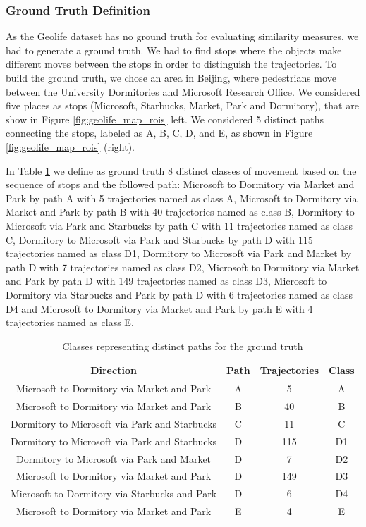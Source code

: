 \documentclass[12pt]{article}
\begin{document}
\subsubsection{Ground Truth Definition}
{As the Geolife dataset has no ground truth for evaluating similarity measures, we had to generate a ground truth. We had to find stops where the objects make different moves between the stops in order to distinguish the trajectories.}
To build the ground truth, we chose an area in Beijing, where pedestrians move between the University Dormitories and Microsoft Research Office. We considered five places as stops (Microsoft, Starbucks, Market, Park and Dormitory), that are show in Figure \ref{fig:geolife_map_rois} left. We considered 5 distinct paths connecting the stops, labeled as A, B, C, D, and E, as shown in Figure \ref{fig:geolife_map_rois} (right).

In Table \ref{tab:geolife_dataset} we define as ground truth 8 distinct classes of movement based on the sequence of stops and the followed path: Microsoft to Dormitory via Market and Park by path A with 5 trajectories named as class A, Microsoft to Dormitory via Market and Park by path B with 40 trajectories named as class B, Dormitory to Microsoft via Park and Starbucks by path C with 11 trajectories named as class C, Dormitory to Microsoft via Park and Starbucks by path D with 115 trajectories named as class D1, Dormitory to Microsoft via Park and Market by path D with 7 trajectories named as class D2, Microsoft to Dormitory via Market and Park by path D with 149 trajectories named as class D3, Microsoft to Dormitory via Starbucks and Park by path D with 6 trajectories named as class D4 and Microsoft to Dormitory via Market and Park by path E with 4 trajectories named as class E.

\begin{table}[ht!]
\scriptsize
  \centering
  \begin{tabular}{|c|c|c|c|}
  	\hline
 Direction & Path &  Trajectories & Class \\
  	\hline
Microsoft to Dormitory via Market and Park& A & 5 & A \\
Microsoft to Dormitory via Market and Park& B & 40&B \\
Dormitory to Microsoft via Park and Starbucks& C & 11&C \\
Dormitory to Microsoft via Park and Starbucks& D & 115&D1 \\
Dormitory to Microsoft via Park and Market& D & 7&D2 \\
Microsoft to Dormitory via Market and Park& D & 149&D3 \\
Microsoft to Dormitory via Starbucks and Park& D & 6&D4 \\
Microsoft to Dormitory via Market and Park& E & 4& E \\
    \hline
  \end{tabular}
  \caption{Classes representing distinct paths for the ground truth}
  \label{tab:geolife_dataset}
\end{table}
\end{document}
